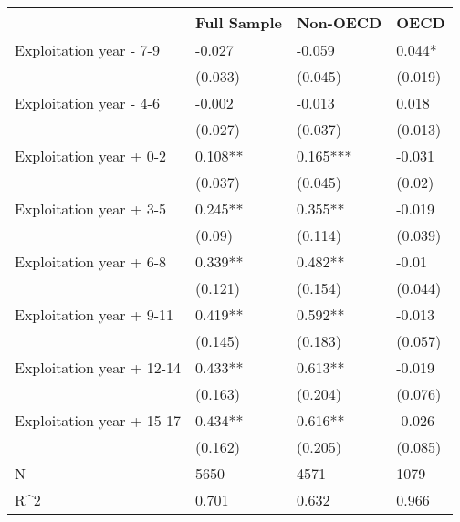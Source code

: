 \begin{tabular}{llll}
\toprule
                          & Full Sample & Non-OECD &    OECD \\
\midrule
  Exploitation year - 7-9 &      -0.027 &   -0.059 &  0.044* \\
                          &     (0.033) &  (0.045) & (0.019) \\
  Exploitation year - 4-6 &      -0.002 &   -0.013 &   0.018 \\
                          &     (0.027) &  (0.037) & (0.013) \\
  Exploitation year + 0-2 &     0.108** & 0.165*** &  -0.031 \\
                          &     (0.037) &  (0.045) &  (0.02) \\
  Exploitation year + 3-5 &     0.245** &  0.355** &  -0.019 \\
                          &      (0.09) &  (0.114) & (0.039) \\
  Exploitation year + 6-8 &     0.339** &  0.482** &   -0.01 \\
                          &     (0.121) &  (0.154) & (0.044) \\
 Exploitation year + 9-11 &     0.419** &  0.592** &  -0.013 \\
                          &     (0.145) &  (0.183) & (0.057) \\
Exploitation year + 12-14 &     0.433** &  0.613** &  -0.019 \\
                          &     (0.163) &  (0.204) & (0.076) \\
Exploitation year + 15-17 &     0.434** &  0.616** &  -0.026 \\
                          &     (0.162) &  (0.205) & (0.085) \\
                        N &        5650 &     4571 &    1079 \\
                      R\textasciicircum 2 &       0.701 &    0.632 &   0.966 \\
\bottomrule
\end{tabular}
